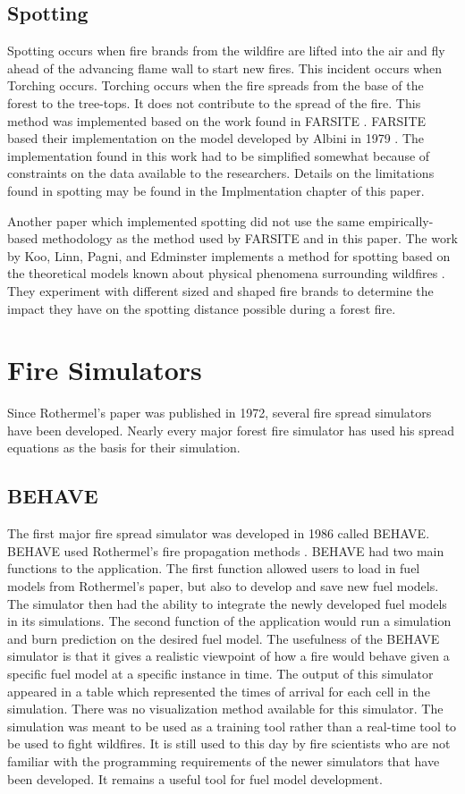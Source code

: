 \subsection{Spotting}
Spotting occurs when fire brands from the wildfire are lifted into the air and fly ahead of the advancing flame wall to start new fires. This incident occurs when Torching occurs. Torching occurs when the fire spreads from the base of the forest to the tree-tops. It does not contribute to the spread of the fire. This method was implemented based on the work found in FARSITE \cite{FARSITE}. FARSITE based their implementation on the model developed by Albini in 1979 \cite{ablini}. The implementation found in this work had to be simplified somewhat because of constraints on the data available to the researchers. Details on the limitations found in spotting may be found in the Implmentation chapter of this paper. 

Another paper which implemented spotting did not use the same empirically-based methodology as the method used by FARSITE and in this paper. The work by Koo, Linn, Pagni, and Edminster implements a method for spotting based on the theoretical models known about physical phenomena surrounding wildfires \cite{firetecSpotting}. They experiment with different sized and shaped fire brands to determine the impact they have on the spotting distance possible during a forest fire. 

\section{Fire Simulators}
Since Rothermel's paper was published in 1972, several fire spread simulators have been developed. Nearly every major forest fire simulator has used his spread equations as the basis for their simulation. 

\subsection{BEHAVE}
The first major fire spread simulator was developed in 1986 called BEHAVE\cite{BEHAVE}. BEHAVE used Rothermel's fire propagation methods \cite{roth}. BEHAVE had two main functions to the application. The first function allowed users to load in fuel models from Rothermel's paper, but also to develop and save new fuel models. The simulator then had the ability to integrate the newly developed fuel models in its simulations. The second function of the application would run a simulation and burn prediction on the desired fuel model. The usefulness of the BEHAVE simulator is that it gives a realistic viewpoint of how a fire would behave given a specific fuel model at a specific instance in time. The output of this simulator appeared in a table which represented the times of arrival for each cell in the simulation. There was no visualization method available for this simulator. The simulation was meant to be used as a training tool rather than a real-time tool to be used to fight wildfires. It is still used to this day by fire scientists who are not familiar with the programming requirements of the newer simulators that have been developed. It remains a useful tool for fuel model development. 

